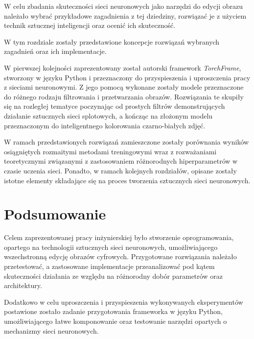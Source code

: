 \documentclass[10pt, a4paper, twoside]{article}
\begin{document}
  W celu zbadania skuteczności sieci neuronowych jako narzędzi do edycji obrazu
  należało wybrać przykładowe zagadnienia z tej dziedziny, rozwiązać je z
  użyciem technik sztucznej inteligencji oraz ocenić ich skuteczność.

  W tym rozdziale zostały przedstawione koncepcje rozwiązań wybranych zagadnień
  oraz ich implementacje.

  W pierwszej kolejności zaprezentowany został autorski framework \textit{TorchFrame},
  stworzony w języku Python i przeznaczony do przyspieszenia i uproszczenia
  pracy z sieciami neuronowymi. Z jego pomocą wykonane zostały modele przeznaczone
  do różnego rodzaju filtrowania i przetwarzania obrazów. Rozwiązania te
  skupiły się na rozległej tematyce poczynając od prostych filtrów demonstrujących
  działanie sztucznych sieci splotowych, a kończąc na złożonym modelu przeznaczonym do
  inteligentnego kolorowania czarno-białych zdjęć.

  W ramach przedstawionych rozwiązań zamieszczone zostały porównania wyników
  osiągniętych rozmaitymi metodami treningowymi wraz z rozważaniami teoretycznymi
  związanymi z zastosowaniem różnorodnych hiperparametrów w czasie uczenia sieci.
  Ponadto, w ramach kolejnych rozdziałów, opisane zostały istotne
  elementy składające się na proces tworzenia sztucznych sieci neuronowych.

  

  

  

\section{Podsumowanie}

  Celem zaprezentowanej pracy inżynierskiej było stworzenie oprogramowania,
  opartego na technologii sztucznych sieci neuronowych, umożliwiającego
  wszechstronną edycję obrazów cyfrowych. Przygotowane rozwiązania należało
  przetestować, a zastosowane implementacje przeanalizować pod kątem
  skuteczności działania ze względu na różnorodny dobór parametrów oraz
  architektury.

  Dodatkowo w celu uproszczenia i przyspieszenia wykonywanych eksperymentów
  postawione zostało zadanie przygotowania frameworka w języku Python, umożliwiającego
  łatwe komponowanie oraz testowanie narzędzi opartych o mechanizmy sieci
  neuronowych.
\end{document}
